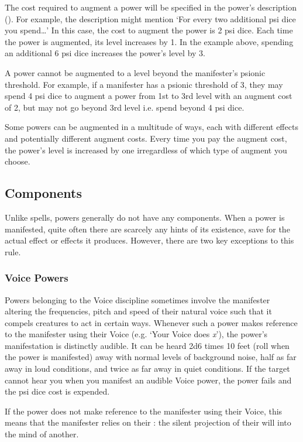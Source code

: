 The cost required to augment a power will be specified
in the power's description ().
For example, the description might mention
`For every two additional psi dice you spend\dots'
In this case, the cost to augment the power is 2 psi dice.
Each time the power is augmented,
its level increases by 1.
In the example above,
spending an additional 6 psi dice increases the power's level by 3.

A power cannot be augmented to a level beyond the manifester's
psionic threshold.
For example,
if a manifester has a psionic threshold of 3,
they may spend 4 psi dice to augment a power from
1st to 3rd level with an augment cost of 2,
but may not go beyond 3rd level i.e. spend beyond 4 psi dice.

Some powers can be augmented in a multitude of ways,
each with different effects
and potentially different augment costs.
Every time you pay the augment cost,
the power's level is increased by one
irregardless of which type of augment you choose.

\subsection{Components}
Unlike spells,
powers generally do not have any components.
When a power is manifested,
quite often there are scarcely any hints of its existence,
save for the actual effect or effects it produces.
However, there are two key exceptions to this rule.

\subsubsection{Voice Powers}
\label{subs:voice_powers}
Powers belonging to the Voice discipline sometimes involve
the manifester altering the frequencies, pitch and
speed of their natural voice such that it compels
creatures to act in certain ways.
Whenever such a power makes reference to the manifester
using their Voice (e.g. `Your Voice does \textit{x}'),
the power's manifestation is distinctly audible.
It can be heard 2d6 times 10 feet
(roll when the power is manifested)
away with normal levels of background noise,
half as far away in loud conditions,
and twice as far away in quiet conditions.
If the target cannot hear you when you manifest an
audible Voice power,
the power fails and the psi dice cost is expended.

If the power does not make reference to the manifester
using their Voice,
this means that the manifester relies on their
: the silent projection of their will
into the mind of another.

